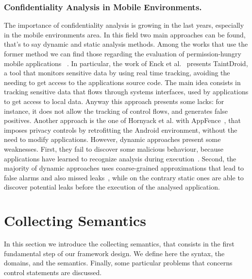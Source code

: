 \documentclass{llncs}
\begin{document}
\subsubsection{Confidentiality Analysis in Mobile Environments.}
The importance of confidentiality analysis is growing in the last years, especially in the mobile environments area. In this field two main approaches can be found, that's to say dynamic and static analysis methods. Among the works that use the former method we can find those regarding the evaluation of permission-hungry mobile applications ~\cite{Arzt14,TUD-CS-2014-0849}. In particular, the work of Enck et al.~\cite{Enck:2014:TIT:2642648.2619091} presents TaintDroid, a tool that monitors sensitive data by using real time tracking, avoiding the needing to get access to the applications source code. The main idea consists in tracking sensitive data that flows through systems interfaces, used by applications to get access to local data. Anyway this approach presents some lacks: for instance, it does not allow the tracking of control flows, and generates false positives. Another approach is the one of Hornyack et al. with AppFence~\cite{Hornyack}, that imposes privacy controls by retrofitting the Android environment, without the need to modify applications.
However, dynamic approaches present some weaknesses. First, they fail to discover some malicious behaviour, because applications have learned to recognize analysis during execution~\cite{fritz2013highly}. Second, the majority of dynamic approaches uses coarse-grained approximations that lead to false alarms and also missed leaks~\cite{Arzt14}, while on the contrary static ones are able to discover potential leaks before the execution of the analysed application.


\section{Collecting Semantics}

In this section we introduce the collecting semantics, that consists in the first fundamental step of our framework design. We define here the syntax, the domains, and the semantics. Finally, some particular problems that concerns control statements are discussed.
\end{document}
